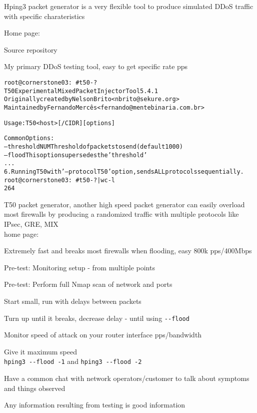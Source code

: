 \documentclass[Screen16to9,17pt]{foils}
\begin{document}
\begin{list2}
\item Hping3 packet generator is a very flexible tool to produce simulated DDoS traffic with specific charateristics
\item Home page: 
\item Source repository 
\end{list2}

\centerline{My primary DDoS testing tool, easy to get specific rate pps}




\begin{alltt}\footnotesize
root@cornerstone03:~# t50 -?
T50 Experimental Mixed Packet Injector Tool 5.4.1
Originally created by Nelson Brito <nbrito@sekure.org>
Maintained by Fernando Mercês <fernando@mentebinaria.com.br>

Usage: T50 <host> [/CIDR] [options]

Common Options:
    --threshold NUM        Threshold of packets to send     (default 1000)
    --flood                This option supersedes the 'threshold'
...
6. Running T50 with '--protocol T50' option, sends ALL protocols sequentially.
root@cornerstone03:~# t50 -? | wc -l
264
\end{alltt}

\begin{list2}
\item T50 packet generator, another high speed packet generator
can easily overload most firewalls by producing a randomized traffic with multiple protocols like IPsec, GRE, MIX \\
home page: 
\end{list2}

\centerline{Extremely fast and breaks most firewalls when flooding, easy 800k pps/400Mbps}


\begin{list2}
\item Pre-test: Monitoring setup - from multiple points
\item Pre-test: Perform full Nmap scan of network and ports
\item Start small, run with delays between packets
\item Turn up until it breaks, decrease delay - until using \verb+--flood+
\item Monitor speed of attack on your router interface pps/bandwidth
\item Give it maximum speed\\
 \verb+hping3 --flood -1+ and \verb+hping3 --flood -2+
\item Have a common chat with network operators/customer to talk about symptoms and things observed
\item Any information resulting from testing is good information
\end{list2}
\end{document}
